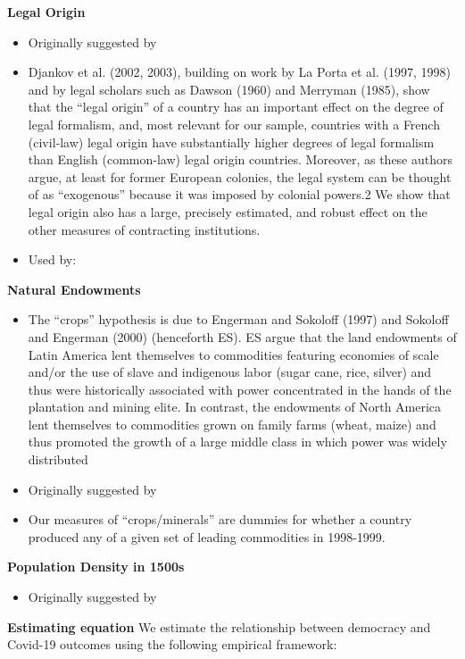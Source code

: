 \noindent \textbf{Legal Origin}
\begin{itemize}
    \item Originally suggested by \citet{econ-con}
    \item Djankov et al. (2002, 2003), building on work by La Porta et al. (1997, 1998) and by legal scholars such as Dawson (1960) and Merryman (1985), show that the “legal origin” of a country has an important effect on the degree of legal formalism, and, most relevant for our sample, countries with a French (civil‐law) legal origin have substantially higher degrees of legal formalism than English (common‐law) legal origin countries. Moreover, as these authors argue, at least for former European colonies, the legal system can be thought of as “exogenous” because it was imposed by colonial powers.2 We show that legal origin also has a large, precisely estimated, and robust effect on the other measures of contracting institutions.
    \item Used by: \citet{acemoglu2005unbundling}
\end{itemize}

\noindent \textbf{Natural Endowments}
\begin{itemize}
    \item The “crops” hypothesis is due to Engerman and Sokoloff (1997) and Sokoloff and Engerman (2000) (henceforth ES). ES argue that the land endowments of Latin America lent themselves to commodities featuring economies of scale and/or the use of slave and indigenous labor (sugar cane, rice, silver) and thus were historically associated with power concentrated in the hands of the plantation and mining elite. In contrast, the endowments of North America lent themselves to commodities grown on family farms (wheat, maize) and thus promoted the growth of a large middle class in which power was widely distributed
    \item Originally suggested by \citet{easterly2003}
    \item Our measures of “crops/minerals” are dummies for whether a country produced any of a given set of leading commodities in 1998-1999. 
\end{itemize}

\noindent \textbf{Population Density in 1500s}
\begin{itemize}
    \item Originally suggested by \citet{acemoglu2003}
\end{itemize}


\noindent \textbf{Estimating equation} We estimate the relationship between democracy and Covid-19 outcomes using the following empirical framework: 

